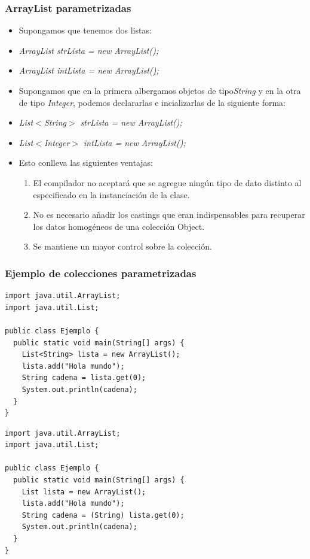 \documentclass{beamer}
\begin{document}
\begin{frame}[fragile]
    \frametitle{ArrayList parametrizadas}
 \begin{itemize}[<+->]
 \item Supongamos que tenemos dos listas:
 \item \emph{ArrayList strLista = new ArrayList();}
 \item \emph{ArrayList intLista = new ArrayList();}
 \item Supongamos que en la primera albergamos objetos de tipo\emph{String} y en la otra de tipo \emph{Integer}, podemos declararlas e incializarlas de la siguiente forma:
 \item \emph{List$<$String$>$ strLista = new ArrayList();}
 \item \emph{List$<$Integer$>$ intLista = new ArrayList();}
 \item Esto conlleva las siguientes ventajas:
 \begin{enumerate}
	\item El compilador no aceptará que se agregue ningún tipo de dato distinto al especificado en la instanciación de la clase.
	\item No es necesario añadir los castings que eran indispensables para recuperar los datos homogéneos de una colección Object.
	\item Se mantiene un mayor control sobre la colección.
\end{enumerate}
 \end{itemize}
\end{frame}

\begin{frame}[fragile]
\frametitle{Ejemplo de colecciones parametrizadas}
\begin{scriptsize}
\begin{verbatim}
import java.util.ArrayList;  
import java.util.List;  
      
public class Ejemplo {  
  public static void main(String[] args) {  
    List<String> lista = new ArrayList();  
    lista.add("Hola mundo");  
    String cadena = lista.get(0);  
    System.out.println(cadena);  
  }  
}  
\end{verbatim}
\pause
\begin{verbatim}
import java.util.ArrayList;  
import java.util.List;  
  
public class Ejemplo {  
  public static void main(String[] args) {  
    List lista = new ArrayList();  
    lista.add("Hola mundo");  
    String cadena = (String) lista.get(0);  
    System.out.println(cadena);  
  }  
}  
\end{verbatim}
\end{scriptsize}
\end{frame}
\end{document}
